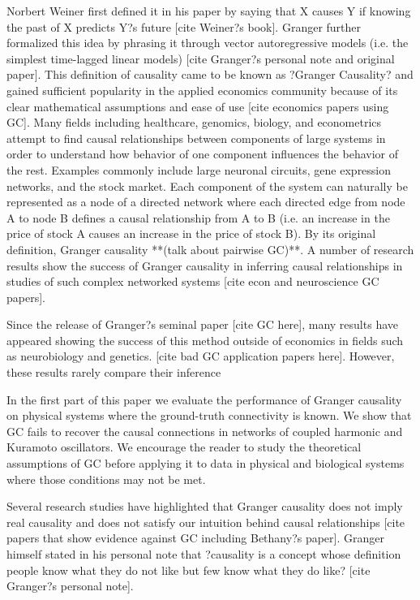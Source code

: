 \documentclass[]{article}
\begin{document}
Norbert Weiner first defined it in his paper by saying that X causes Y if knowing the past of X predicts Y?s future [cite Weiner?s book]. Granger further formalized this idea by phrasing it through vector autoregressive models (i.e. the simplest time-lagged linear models) [cite Granger?s personal note and original paper]. This definition of causality came to be known as ?Granger Causality? and gained sufficient popularity in the applied economics community because of its clear mathematical assumptions and ease of use [cite economics papers using GC]. Many fields including healthcare, genomics, biology, and econometrics attempt to find causal relationships between components of large systems in order to understand how behavior of one component influences the behavior of the rest. Examples commonly include large neuronal circuits, gene expression networks, and the stock market. Each component of the system can naturally be represented as a node of a directed network where each directed edge from node A to node B defines a causal relationship from A to B (i.e. an increase in the price of stock A causes an increase in the price of stock B). By its original definition, Granger causality **(talk about pairwise GC)**. A number of research results show the success of Granger causality in inferring causal relationships in studies of such complex networked systems [cite econ and neuroscience GC papers]. 

Since the release of Granger?s seminal paper [cite GC here], many results have appeared showing the success of this method outside of economics in fields such as neurobiology and genetics. [cite bad GC application papers here]. However, these results rarely compare their inference

In the first part of this paper we evaluate the performance of Granger causality on physical systems where the ground-truth connectivity is known. We show that GC fails to recover the causal connections in networks of coupled harmonic and Kuramoto oscillators. We encourage the reader to study the theoretical assumptions of GC before applying it to data in physical and biological systems where those conditions may not be met.

Several research studies have highlighted that Granger causality does not imply real causality and does not satisfy our intuition behind causal relationships [cite papers that show evidence against GC including Bethany?s paper]. Granger himself stated in his personal note that ?causality is a concept whose definition people know what they do not like but few know what they do like? [cite Granger?s personal note].
\end{document}

